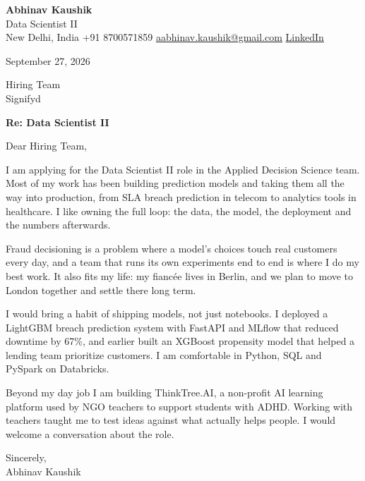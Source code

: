 \documentclass[11pt,a4paper]{article}
\begin{document}
{\Large\bfseries Abhinav Kaushik}\\
Data Scientist II\\
New Delhi, India \textbar{} +91 8700571859 \textbar{} \href{mailto:aabhinav.kaushik@gmail.com}{aabhinav.kaushik@gmail.com} \textbar{} \href{https://www.linkedin.com/in/abhinav-kaushik10/}{LinkedIn}  

September 27, 2026

Hiring Team\\
Signifyd

\textbf{Re: Data Scientist II}

Dear Hiring Team,

I am applying for the Data Scientist II role in the Applied Decision Science team. Most of my work has been building prediction models and taking them all the way into production, from SLA breach prediction in telecom to analytics tools in healthcare. I like owning the full loop: the data, the model, the deployment and the numbers afterwards.

Fraud decisioning is a problem where a model's choices touch real customers every day, and a team that runs its own experiments end to end is where I do my best work. It also fits my life: my fiancée lives in Berlin, and we plan to move to London together and settle there long term.

I would bring a habit of shipping models, not just notebooks. I deployed a LightGBM breach prediction system with FastAPI and MLflow that reduced downtime by 67\%, and earlier built an XGBoost propensity model that helped a lending team prioritize customers. I am comfortable in Python, SQL and PySpark on Databricks.

Beyond my day job I am building ThinkTree.AI, a non-profit AI learning platform used by NGO teachers to support students with ADHD. Working with teachers taught me to test ideas against what actually helps people. I would welcome a conversation about the role.

Sincerely,\\[4pt]
Abhinav Kaushik
\end{document}

